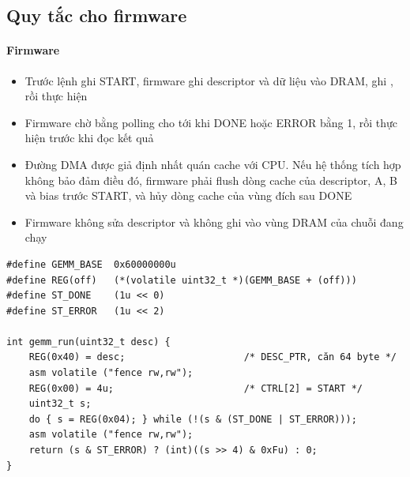 \subsection{Quy tắc cho firmware}\label{sec:2.5}

\paragraph{Firmware}\label{par:2-5}
\begin{itemize}
\item Trước lệnh ghi START, firmware ghi descriptor và dữ liệu vào DRAM, ghi , rồi thực hiện 
\item Firmware chờ bằng polling cho tới khi DONE hoặc ERROR bằng 1, rồi thực hiện  trước khi đọc kết quả
\item Đường DMA được giả định nhất quán cache với CPU. Nếu hệ thống tích hợp không bảo đảm điều đó, firmware phải flush dòng cache của descriptor, A, B và bias trước START, và hủy dòng cache của vùng đích sau DONE
\item Firmware không sửa descriptor và không ghi vào vùng DRAM của chuỗi đang chạy
\end{itemize}

\begin{Verbatim}[frame=leftline,framerule=2pt,rulecolor=\color{brand},xleftmargin=6pt,samepage=true]
#define GEMM_BASE  0x60000000u
#define REG(off)   (*(volatile uint32_t *)(GEMM_BASE + (off)))
#define ST_DONE    (1u << 0)
#define ST_ERROR   (1u << 2)

int gemm_run(uint32_t desc) {
    REG(0x40) = desc;                     /* DESC_PTR, căn 64 byte */
    asm volatile ("fence rw,rw");
    REG(0x00) = 4u;                       /* CTRL[2] = START */
    uint32_t s;
    do { s = REG(0x04); } while (!(s & (ST_DONE | ST_ERROR)));
    asm volatile ("fence rw,rw");
    return (s & ST_ERROR) ? (int)((s >> 4) & 0xFu) : 0;
}
\end{Verbatim}
